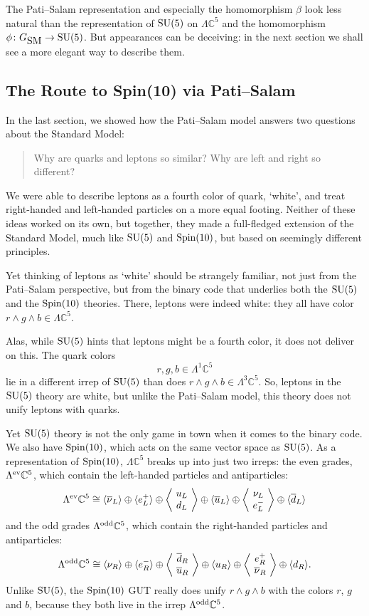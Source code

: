 \documentclass{article}
\newcommand{\maps}{\colon}    %
\newcommand{\C}{{\mathbb C}}  %
\newcommand{\SU}{{\rm SU}}    %
\newcommand{\Spin}{{\rm Spin}}    %
\newcommand{\Ex}{\Lambda} %
\newcommand{\Exev}{\Lambda^{\rm ev}} %
\newcommand{\Exodd}{\Lambda^{\rm odd}} %
\newcommand{\iso}{\cong} %
\newcommand{\GSM}{{G_{\mbox{\rm SM}}}}  %
\newcommand{\ubar}{\overline{u}} %
\newcommand{\dbar}{\overline{d}} %
\newcommand{\nubar}{\overline{\nu}} %
\newcommand{\anglep}{\left\langle \! \begin{array}{c} \nu_L \\ e^-_L \end{array} \! \right\rangle} %
\newcommand{\angantilep}{\left\langle \! \begin{array}{c} e^+_R \\ \nubar_R \end{array} \! \right\rangle} %
\newcommand{\angquark}{\left\langle \! \begin{array}{c} u_L \\ d_L \end{array} \! \right\rangle} %
\newcommand{\angantiquark}{\left\langle \! \begin{array}{c} \dbar_R \\ \ubar_R \end{array} \! \right\rangle} %
\begin{document}
The Pati--Salam representation and especially the homomorphism
$\beta$ look less natural than the representation of $\SU(5)$ on 
$\Lambda \C^5$ and the homomorphism $\phi \maps \GSM \to \SU(5)$.  
But appearances can be deceiving: in the next section we shall see 
a more elegant way to describe them.

\subsection{The Route to Spin(10) via Pati--Salam} \label{sec:route}

In the last section, we showed how the Pati--Salam model answers two questions
about the Standard Model:

\begin{quote}
	Why are quarks and leptons so similar?  Why are left and right so
	different?
\end{quote}

We were able to describe leptons as a fourth color of quark, `white', and
treat right-handed and left-handed particles on a more equal footing.
Neither of these ideas worked on its own, but together, they made
a full-fledged extension of the Standard Model, much like $\SU(5)$ and
$\Spin(10)$, but based on seemingly different principles.

Yet thinking of leptons as `white' should be strangely familiar, not
just from the Pati--Salam perspective, but
from the binary code that underlies both the $\SU(5)$ and the
$\Spin(10)$ theories. There, leptons were indeed white: they all have
color $r \wedge g \wedge b \in \Ex \C^5$.

Alas, while $\SU(5)$ hints that leptons might be a fourth color, it does not
deliver on this. The quark colors 
\[ r, g, b \in \Ex^1 \C^5 \]
lie in a different irrep of $\SU(5)$ than does $r \wedge g \wedge b \in \Ex^3
\C^5$.  So, leptons in the $\SU(5)$ theory are white, but unlike
the Pati--Salam model, this theory
does not unify leptons with quarks.

Yet $\SU(5)$ theory is not the only game in town when it comes to the binary
code. We also have $\Spin(10)$, which acts on the same vector space as
$\SU(5)$. As a representation of $\Spin(10)$, $\Ex \C^5$ breaks up into just
two irreps: the even grades, $\Exev \C^5$, which contain the left-handed
particles and antiparticles:
\[ \Exev \C^5 \iso \langle \nubar_L \rangle \oplus \langle e^+_L \rangle \oplus \angquark \oplus \langle \ubar_L \rangle \oplus \anglep \oplus \langle \dbar_L \rangle \]
and the odd grades $\Exodd \C^5$, which contain the right-handed particles and
antiparticles:
\[ \Exodd \C^5 \iso \langle \nu_R \rangle \oplus \langle e^-_R \rangle \oplus \angantiquark \oplus \langle u_R \rangle \oplus \angantilep \oplus \langle d_R \rangle.
\]
Unlike $\SU(5)$, the $\Spin(10)$ GUT really does unify 
$r \wedge g \wedge b$ with the colors $r$, $g$ and $b$, because they 
both live in the irrep $\Exodd \C^5$. 
\end{document}
